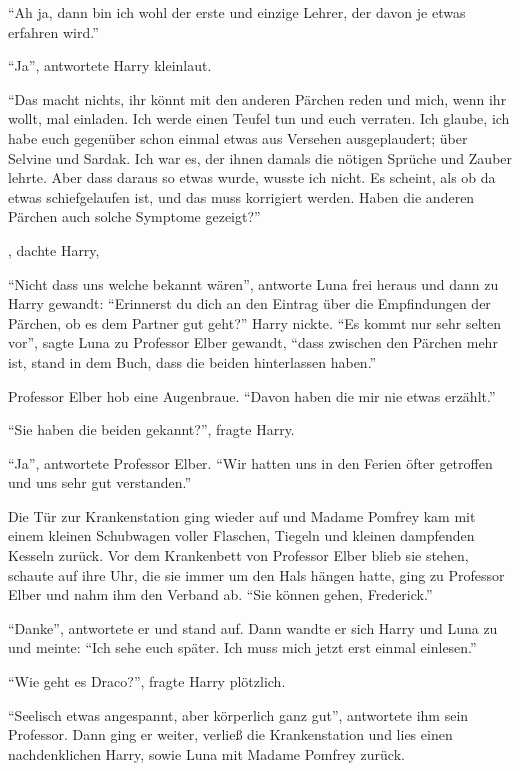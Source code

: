 \enquote{Ah ja, dann bin ich wohl der erste und einzige Lehrer, der davon je etwas erfahren wird.}

\enquote{Ja}, antwortete Harry kleinlaut.

\enquote{Das macht nichts, ihr könnt mit den anderen Pärchen reden und mich, wenn ihr wollt, mal einladen. Ich werde einen Teufel tun und euch verraten. \gst Ich glaube, ich habe euch gegenüber schon einmal etwas aus Versehen ausgeplaudert; über Selvine und Sardak. Ich war es, der ihnen damals die nötigen Sprüche und Zauber lehrte. Aber dass daraus so etwas wurde, wusste ich nicht. Es scheint, als ob da etwas schiefgelaufen ist, und das muss korrigiert werden. \gst Haben die anderen Pärchen auch solche Symptome gezeigt?}

, dachte Harry, 

\enquote{Nicht dass uns welche bekannt wären}, antworte Luna frei heraus und dann zu Harry gewandt: \enquote{Erinnerst du dich an den Eintrag über die Empfindungen der Pärchen, ob es dem Partner gut geht?} Harry nickte. \enquote{Es kommt nur sehr selten vor}, sagte Luna zu Professor Elber gewandt, \enquote{dass zwischen den Pärchen mehr ist, stand in dem Buch, dass die beiden hinterlassen haben.}

Professor Elber hob eine Augenbraue. \enquote{Davon haben die mir nie etwas erzählt.}

\enquote{Sie haben die beiden gekannt?}, fragte Harry.

\enquote{Ja}, antwortete Professor Elber. \enquote{Wir hatten uns in den Ferien öfter getroffen und uns sehr gut verstanden.}

Die Tür zur Krankenstation ging wieder auf und Madame Pomfrey kam mit einem kleinen Schubwagen voller Flaschen, Tiegeln und kleinen dampfenden Kesseln zurück. Vor dem Krankenbett von Professor Elber blieb sie stehen, schaute auf ihre Uhr, die sie immer um den Hals hängen hatte, ging zu Professor Elber und nahm ihm den Verband ab. \enquote{Sie können gehen, Frederick.}

\enquote{Danke}, antwortete er und stand auf. Dann wandte er sich Harry und Luna zu und meinte: \enquote{Ich sehe euch später. Ich muss mich jetzt erst einmal einlesen.}

\enquote{Wie geht es Draco?}, fragte Harry plötzlich.

\enquote{Seelisch etwas angespannt, aber körperlich ganz gut}, antwortete ihm sein Professor. Dann ging er weiter, verließ die Krankenstation und lies einen nachdenklichen Harry, sowie Luna mit Madame Pomfrey zurück.

